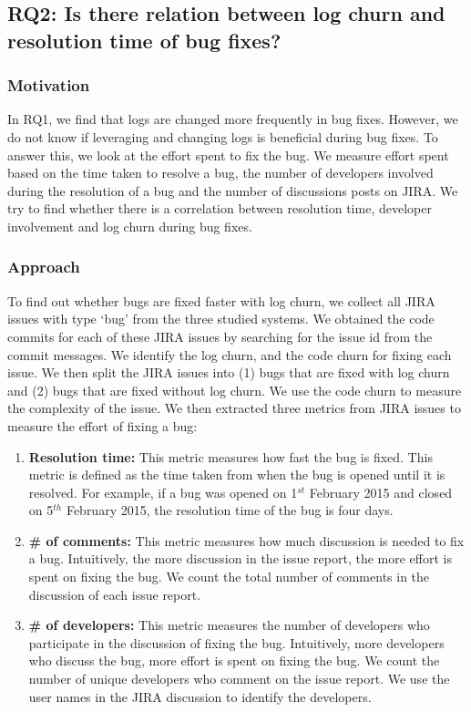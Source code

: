 \subsection*{\textbf{RQ2: Is there relation between log churn and resolution time of bug fixes?}}


\subsubsection*{\textbf{Motivation}}

In RQ1, we find that logs are changed more frequently in bug fixes. However, we do not know if leveraging and changing logs is beneficial during bug fixes. To answer this, we look at the  effort spent to fix the bug. We measure effort spent based on the time taken to resolve a bug, the number of developers involved during the resolution of a bug and the number of discussions posts on JIRA. We try to find whether there is a correlation between resolution time, developer involvement and log churn during bug fixes. 


\subsubsection*{\textbf{Approach}}

To find out whether bugs are fixed faster with log churn, we collect all JIRA issues with type `bug' from the three studied systems. We obtained the code commits for each of these JIRA issues by searching for the issue id from the commit messages. We identify the log churn, and the code churn for fixing each issue. We then split the JIRA issues into (1) bugs that are fixed with log churn and (2) bugs that are fixed without log churn. We use the code churn to measure the complexity of the issue. We then extracted three metrics from JIRA issues to measure the effort of fixing a bug:

\begin{enumerate}
	\item \textbf{Resolution time:} This metric measures how fast the bug is fixed. This metric is defined as the time taken from when the bug is opened until it is resolved. For example, if a bug was opened on 1$ ^{st}$ February 2015 and closed on 5$ ^{th}$ February 2015, the resolution time of the bug is four days. 
	
	\item \textbf {\# of comments:} This metric measures how much discussion is needed to fix a bug. Intuitively, the more discussion in the issue report, the more effort is spent on fixing the bug. We count the total number of comments in the discussion of each issue report.
	
	\item \textbf {\# of developers:} This metric measures the number of developers who participate in the discussion of fixing the bug. Intuitively, more developers who discuss the bug, more effort is spent on fixing the bug. We count the number of unique developers who comment on the issue report. We use the user names in the JIRA discussion to identify the developers. 
\end{enumerate}

